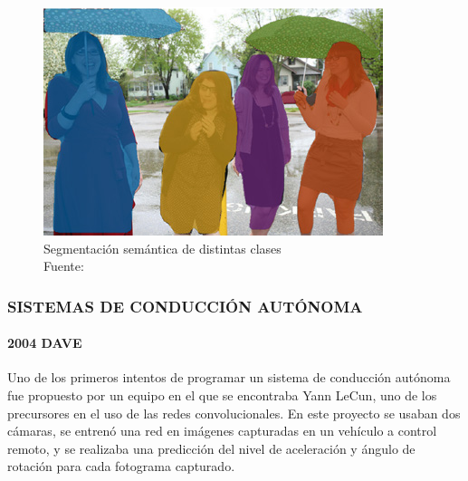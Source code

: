 \begin{figure}[H]
    \centering
    \includegraphics[scale=0.5]{imagenes/maskrcnn}
    \caption[Segmentación semántica de distintas clases]{Segmentación semántica de distintas clases\\Fuente: \citep{mask-rcnn}}
\end{figure}
\subsubsection{SISTEMAS DE CONDUCCIÓN AUTÓNOMA}

\paragraph{2004 DAVE}
Uno de los primeros intentos de programar un sistema de conducción autónoma fue propuesto por un equipo en el que se encontraba Yann LeCun, uno de los precursores en el uso de las redes convolucionales. En este proyecto se usaban dos cámaras, se entrenó una red en imágenes capturadas en un vehículo a control remoto, y se realizaba una predicción del nivel de aceleración y ángulo de rotación para cada fotograma capturado. \citep{LeCun:04-dave}


